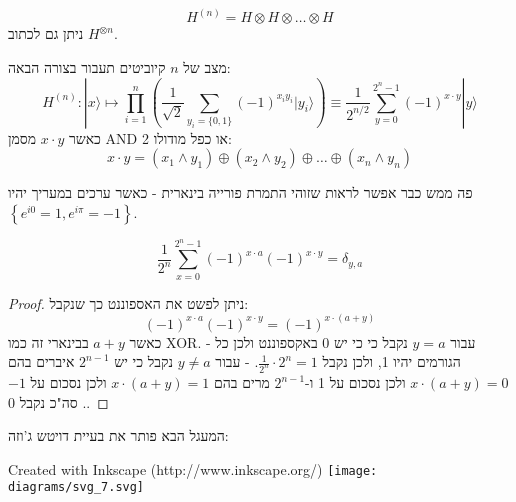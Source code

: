 \documentclass{tstextbook}
\begin{document}
\begin{definition}
$${ H}^{(n)}={ H}\otimes{ H}\otimes\ldots\otimes{ H}$$
ניתן גם לכתוב \(H^{\otimes n}\).

\end{definition}
\begin{corollary}
מצב של \(n\) קיוביטים תעבור בצורה הבאה:
$${H}^{(n)}:|x\rangle\mapsto\prod_{i=1}^{n}\left({\frac{1}{\sqrt{2}}}\sum_{y_{i}=\{0,1\}}(-1)^{x_{i}y_{i}}|y_{i}\rangle\right)\equiv{\frac{1}{2^{n/2}}}\sum_{y=0}^{2^{n}-1}(-1)^{x\cdot y}|y\rangle$$
כאשר \(x\cdot y\) מסמן AND או כפל מודולו 2:
$$x\cdot y=(x_{1}\wedge y_{1})\oplus(x_{2}\wedge y_{2})\oplus\ldots\oplus(x_{n}\wedge y_{n})$$

\end{corollary}
\begin{remark}
פה ממש כבר אפשר לראות שזוהי התמרת פורייה בינארית - כאשר ערכים במעריך יהיו \(\left\{  e^{ i 0 }=1,e^{ i\pi }=-1  \right\}\).

\end{remark}
\begin{lemma}
$$\frac{1}{2^{n}}\sum_{x=0}^{2^{n}-1}(-1)^{x\cdot a}(-1)^{x\cdot y}=\delta_{y,a}$$

\end{lemma}
\begin{proof}
ניתן לפשט את האספוננט כך שנקבל:
$$(-1)^{x\cdot a}(-1)^{x\cdot y}=(-1)^{x\cdot(a+y)}$$
כאשר \(a+y\) בבינארי זה כמו XOR. 
- עבור \(y=a\) נקבל כי כי יש 0 באקספוננט ולכן כל הגורמים יהיו 1, ולכן נקבל \(\frac{1}{2^{n}}\cdot 2^{n}=1\).
- עבור \(y\neq a\) נקבל כי יש \(2^{n-1}\) איברים בהם \(x\cdot(a+y)=0\) ולכן נסכום על 1 ו-\(2^{n-1}\) מרים בהם \(x\cdot(a+y)=1\) ולכן נסכום על \(-1\). 
סה"כ נקבל 0.

\end{proof}
\begin{proposition}
המעגל הבא פותר את בעיית דויטש ג'וזה:

 Created with Inkscape (http://www.inkscape.org/) \texttt{[image: diagrams/svg\_7.svg]}
\end{proposition}
\end{document}
